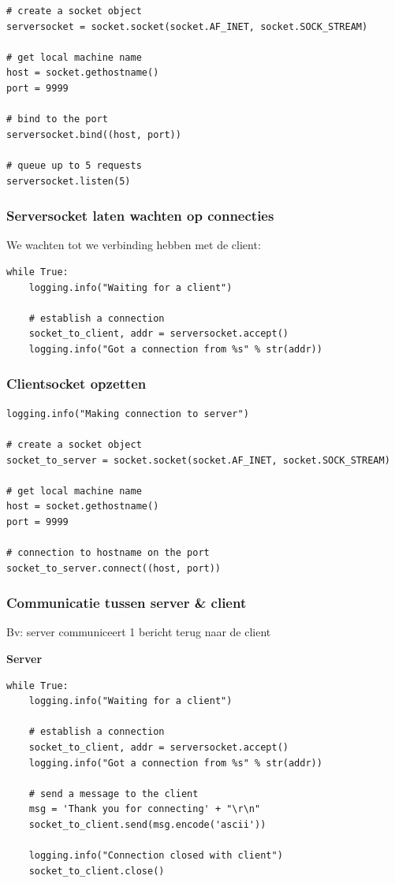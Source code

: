\documentclass{article}
\begin{document}
\begin{verbatim}
# create a socket object
serversocket = socket.socket(socket.AF_INET, socket.SOCK_STREAM)

# get local machine name
host = socket.gethostname()
port = 9999

# bind to the port
serversocket.bind((host, port))

# queue up to 5 requests
serversocket.listen(5)
\end{verbatim}


\subsubsection{Serversocket laten wachten op connecties}

We wachten tot we verbinding hebben met de client:

\begin{verbatim}
while True:
    logging.info("Waiting for a client")
    
    # establish a connection
    socket_to_client, addr = serversocket.accept()
    logging.info("Got a connection from %s" % str(addr))
\end{verbatim}

\subsubsection{Clientsocket opzetten}

\begin{verbatim}
logging.info("Making connection to server")

# create a socket object
socket_to_server = socket.socket(socket.AF_INET, socket.SOCK_STREAM)

# get local machine name
host = socket.gethostname()
port = 9999

# connection to hostname on the port
socket_to_server.connect((host, port))
\end{verbatim}

\subsubsection{Communicatie tussen server \& client}

Bv: server communiceert 1 bericht terug naar de client

\textbf{Server}

\begin{verbatim}
while True:
    logging.info("Waiting for a client")

    # establish a connection 
    socket_to_client, addr = serversocket.accept()
    logging.info("Got a connection from %s" % str(addr))
    
    # send a message to the client
    msg = 'Thank you for connecting' + "\r\n"
    socket_to_client.send(msg.encode('ascii'))

    logging.info("Connection closed with client")
    socket_to_client.close()
\end{verbatim}
\end{document}
